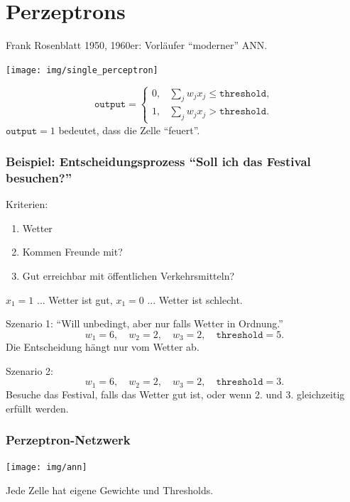 \documentclass[
 a4paper,
 12pt,
 parskip=half
 ]{scrreprt}
\theoremstyle{plain}
\theoremstyle{definition}
\newcommand{\thr}{\texttt{threshold}}
\begin{document}
\clearpage

\section{Perzeptrons}
Frank Rosenblatt 1950, 1960er: Vorläufer ``moderner'' ANN.
\begin{center}
  \begin{minipage}{.45\textwidth}
    \begin{center}
      \texttt{[image: img/single\_perceptron]}
    \end{center}
  \end{minipage}
  \begin{minipage}{.45\textwidth}
    \[ \texttt{output} =
      \begin{cases}
        0, & \sum_j w_j x_j \le \texttt{threshold}, \\
        1, & \sum_j w_j x_j > \texttt{threshold}.
      \end{cases}
    \]
    $\texttt{output} = 1$ bedeutet, dass die Zelle ``feuert''.
  \end{minipage}
\end{center}

\subsubsection*{Beispiel: Entscheidungsprozess ``Soll ich das Festival
  besuchen?''}

Kriterien:
\begin{enumerate}
\item Wetter
\item Kommen Freunde mit?
\item Gut erreichbar mit öffentlichen Verkehrsmitteln?
\end{enumerate}

$x_1 = 1$ ... Wetter ist gut, $x_1 = 0$ ... Wetter ist schlecht.

Szenario 1: ``Will unbedingt, aber nur falls Wetter in Ordnung.''
\[ w_1 = 6, \quad
  w_2 = 2, \quad
  w_3 = 2, \quad
  \thr = 5. \]
Die Entscheidung hängt nur vom Wetter ab.

Szenario 2:
\[ w_1 = 6, \quad
  w_2 = 2, \quad
  w_3 = 2, \quad
  \thr = 3. \]
Besuche das Festival, falls das Wetter gut ist, oder wenn 2. und 3. gleichzeitig
erfüllt werden.

\subsubsection*{Perzeptron-Netzwerk}
\begin{center}
  \texttt{[image: img/ann]}
\end{center}
Jede Zelle hat eigene Gewichte und Thresholds.
\end{document}
